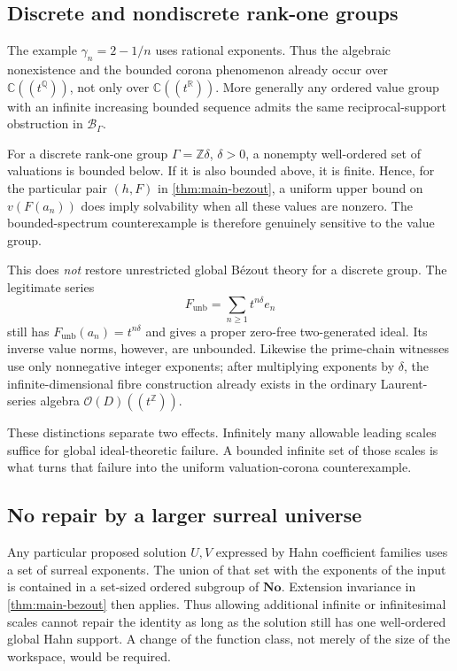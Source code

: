 \documentclass[11pt,letterpaper]{article}
\numberwithin{equation}{section}
\theoremstyle{definition}
\theoremstyle{remark}
\newcommand{\C}{\mathbb C}
\newcommand{\R}{\mathbb R}
\newcommand{\Q}{\mathbb Q}
\newcommand{\Z}{\mathbb Z}
\newcommand{\No}{\mathbf{No}}
\newcommand{\OO}{\mathcal O}
\newcommand{\BB}{\mathcal B}
\begin{document}
\subsection{Discrete and nondiscrete rank-one groups}
The example $\gamma_n=2-1/n$ uses rational exponents. Thus the algebraic
nonexistence and the bounded corona phenomenon already occur over
$\C((t^\Q))$, not only over $\C((t^\R))$. More generally any ordered
value group with an infinite increasing bounded sequence admits the
same reciprocal-support obstruction in $\BB_\Gamma$.

For a discrete rank-one group $\Gamma=\Z\delta$, $\delta>0$, a nonempty
well-ordered set of valuations is bounded below. If it is also bounded
above, it is finite. Hence, for the particular pair $(h,F)$ in
\cref{thm:main-bezout}, a uniform upper bound on $v(F(a_n))$ does imply
solvability when all these values are nonzero. The bounded-spectrum
counterexample is therefore genuinely sensitive to the value group.

This does \emph{not} restore unrestricted global B\'ezout theory for a
discrete group. The legitimate series
\[
 F_{\mathrm{unb}}=\sum_{n\ge1}t^{n\delta}e_n
\]
still has $F_{\mathrm{unb}}(a_n)=t^{n\delta}$ and gives a proper
zero-free two-generated ideal. Its inverse value norms, however, are
unbounded. Likewise the prime-chain witnesses use only nonnegative
integer exponents; after multiplying exponents by $\delta$, the
infinite-dimensional fibre construction already exists in the ordinary
Laurent-series algebra $\OO(D)((t^\Z))$.

These distinctions separate two effects. Infinitely many allowable
leading scales suffice for global ideal-theoretic failure. A bounded
infinite set of those scales is what turns that failure into the
uniform valuation-corona counterexample.

\subsection{No repair by a larger surreal universe}
Any particular proposed solution $U,V$ expressed by Hahn coefficient
families uses a set of surreal exponents. The union of that set with the
exponents of the input is contained in a set-sized ordered subgroup of
$\No$. Extension invariance in \cref{thm:main-bezout} then applies. Thus
allowing additional infinite or infinitesimal scales cannot repair the
identity as long as the solution still has one well-ordered global
Hahn support. A change of the function class, not merely of the size of
the workspace, would be required.
\end{document}
